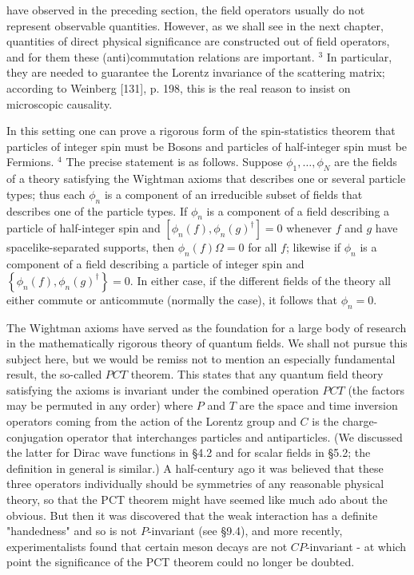 \documentclass[10pt, letterpaper]{article}
\begin{document}
have observed in the preceding section, the field operators usually do not represent observable quantities. However, as we shall see in the next chapter, quantities of direct physical significance are constructed out of field operators, and for them these (anti)commutation relations are important. ${ }^{3}$ In particular, they are needed to guarantee the Lorentz invariance of the scattering matrix; according to Weinberg [131], p. 198, this is the real reason to insist on microscopic causality.

In this setting one can prove a rigorous form of the spin-statistics theorem that particles of integer spin must be Bosons and particles of half-integer spin must be Fermions. ${ }^{4}$ The precise statement is as follows. Suppose $\phi_{1}, \ldots, \phi_{N}$ are the fields of a theory satisfying the Wightman axioms that describes one or several particle types; thus each $\phi_{n}$ is a component of an irreducible subset of fields that describes one of the particle types. If $\phi_{n}$ is a component of a field describing a particle of half-integer spin and $\left[\phi_{n}(f), \phi_{n}(g)^{\dagger}\right]=0$ whenever $f$ and $g$ have spacelike-separated supports, then $\phi_{n}(f) \Omega=0$ for all $f$; likewise if $\phi_{n}$ is a component of a field describing a particle of integer spin and $\left\{\phi_{n}(f), \phi_{n}(g)^{\dagger}\right\}=0$. In either case, if the different fields of the theory all either commute or anticommute (normally the case), it follows that $\phi_{n}=0$.

The Wightman axioms have served as the foundation for a large body of research in the mathematically rigorous theory of quantum fields. We shall not pursue this subject here, but we would be remiss not to mention an especially fundamental result, the so-called $P C T$ theorem. This states that any quantum field theory satisfying the axioms is invariant under the combined operation $P C T$ (the factors may be permuted in any order) where $P$ and $T$ are the space and time inversion operators coming from the action of the Lorentz group and $C$ is the charge-conjugation operator that interchanges particles and antiparticles. (We discussed the latter for Dirac wave functions in §4.2 and for scalar fields in §5.2; the definition in general is similar.) A half-century ago it was believed that these three operators individually should be symmetries of any reasonable physical theory, so that the PCT theorem might have seemed like much ado about the obvious. But then it was discovered that the weak interaction has a definite "handedness" and so is not $P$-invariant (see §9.4), and more recently, experimentalists found that certain meson decays are not $C P$-invariant - at which point the significance of the PCT theorem could no longer be doubted.
\end{document}
